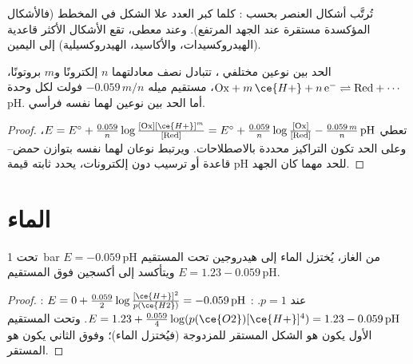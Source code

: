تُرتَّب أشكال العنصر بحسب : كلما كبر
العدد علا الشكل في المخطط (فالأشكال المؤكسدة مستقرة عند الجهد
المرتفع). وعند  معطى، تقع الأشكال الأكثر قاعدية
(الهيدروكسيدات، والأكاسيد،  الهيدروكسيلية) إلى اليمين.

\begin{proposition}\label{prop:b1:e-ph-diagrams:boundary-slope}
الحد بين نوعين مختلفي ، تتبادل نصف معادلتهما
$n$ إلكترونًا و$m$ بروتونًا،
$\mathrm{Ox} + m\,\ce{H+} + n\,\mathrm{e^-} \rightleftharpoons \mathrm{Red} +
\cdots$، مستقيم ميله $-0.059\,m/n$ فولت لكل وحدة pH. أما
الحد بين نوعين لهما  نفسه فرأسي.
\end{proposition}

\begin{proof}
تعطي  $E = E^\circ + \frac{0.059}{n}\log\frac{[\mathrm{Ox}]
[\ce{H+}]^m}{[\mathrm{Red}]} = E^\circ + \frac{0.059}{n}\log\frac{[\mathrm{Ox}]}
{[\mathrm{Red}]} - \frac{0.059\,m}{n}\,\mathrm{pH}$، وعلى الحد تكون
التراكيز محددة بالاصطلاحات. ويرتبط نوعان لهما  نفسه بتوازن حمض--قاعدة أو ترسيب
دون إلكترونات، يحدد ثابته قيمة pH للحد
مهما كان الجهد.
\end{proof}

\section{الماء}

\begin{proposition}\label{prop:b1:e-ph-diagrams:water-lines}
تحت \qty{1}{bar} من الغاز، يُختزل الماء إلى هيدروجين تحت المستقيم
$E = -0.059\,\mathrm{pH}$ ويتأكسد إلى أكسجين فوق المستقيم $E = 1.23
- 0.059\,\mathrm{pH}$.
\end{proposition}

\begin{proof}
: $E = 0 + \frac{0.059}{2}\log\frac{[\ce{H+}]^2}{p(\ce{H2})}
= -0.059\,\mathrm{pH}$ عند $p = 1$. : $E = 1.23 +
\frac{0.059}{4}\log(p(\ce{O2})[\ce{H+}]^4) = 1.23 - 0.059\,\mathrm{pH}$. وتحت
المستقيم الأول يكون  هو الشكل المستقر للمزدوجة (فيُختزل
الماء)؛ وفوق الثاني يكون  هو المستقر.
\end{proof}

